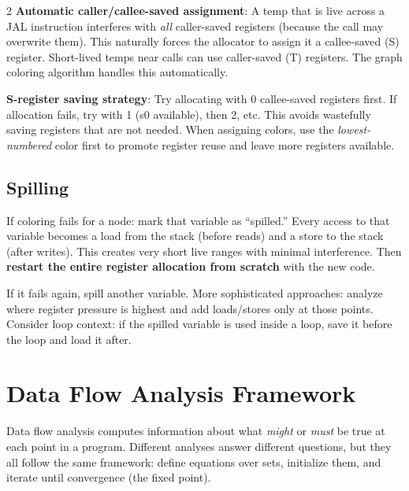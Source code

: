 \documentclass[9pt,landscape]{extarticle}
\begin{document}
\begin{multicols}{2}
\textbf{Automatic caller/callee-saved assignment}: A temp that is live across a JAL instruction interferes with \emph{all} caller-saved registers (because the call may overwrite them). This naturally forces the allocator to assign it a callee-saved (S) register. Short-lived temps near calls can use caller-saved (T) registers. The graph coloring algorithm handles this automatically.

\textbf{S-register saving strategy}: Try allocating with 0 callee-saved registers first. If allocation fails, try with 1 (s0 available), then 2, etc. This avoids wastefully saving registers that are not needed. When assigning colors, use the \emph{lowest-numbered} color first to promote register reuse and leave more registers available.

\subsection{Spilling}

If coloring fails for a node: mark that variable as ``spilled.'' Every access to that variable becomes a load from the stack (before reads) and a store to the stack (after writes). This creates very short live ranges with minimal interference. Then \textbf{restart the entire register allocation from scratch} with the new code.

If it fails again, spill another variable. More sophisticated approaches: analyze where register pressure is highest and add loads/stores only at those points. Consider loop context: if the spilled variable is used inside a loop, save it before the loop and load it after.

\section{Data Flow Analysis Framework}

Data flow analysis computes information about what \emph{might} or \emph{must} be true at each point in a program. Different analyses answer different questions, but they all follow the same framework: define equations over sets, initialize them, and iterate until convergence (the fixed point).


\end{multicols}
\end{document}
